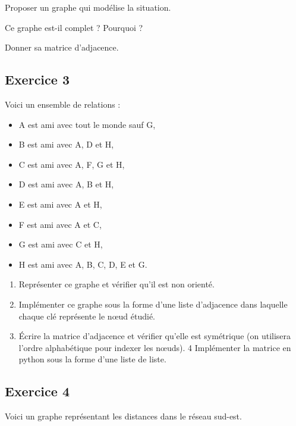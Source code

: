 \documentclass[
  letterpaper,
  DIV=11,
  numbers=noendperiod]{scrartcl}
\providecommand{\tightlist}{%
  \setlength{\itemsep}{0pt}\setlength{\parskip}{0pt}}\usepackage{longtable,booktabs,array}
\begin{document}
Proposer un graphe qui modélise la situation.

Ce graphe est-il complet ? Pourquoi ?

Donner sa matrice d'adjacence.

\hypertarget{fa-solid-pencil-alt-exercice-3}{%
\subsection{\texorpdfstring{ Exercice
3}{ Exercice 3}}\label{fa-solid-pencil-alt-exercice-3}}

Voici un ensemble de relations :

\begin{itemize}
\tightlist
\item
  A est ami avec tout le monde sauf G,
\item
  B est ami avec A, D et H,
\item
  C est ami avec A, F, G et H,
\item
  D est ami avec A, B et H,
\item
  E est ami avec A et H,
\item
  F est ami avec A et C,
\item
  G est ami avec C et H,
\item
  H est ami avec A, B, C, D, E et G.
\end{itemize}

\begin{enumerate}
\def\labelenumi{\arabic{enumi}.}
\tightlist
\item
  Représenter ce graphe et vérifier qu'il est non orienté.
\item
  Implémenter ce graphe sous la forme d'une liste d'adjacence dans
  laquelle chaque clé représente le nœud étudié.
\item
  Écrire la matrice d'adjacence et vérifier qu'elle est symétrique (on
  utilisera l'ordre alphabétique pour indexer les nœuds). 4 Implémenter
  la matrice en python sous la forme d'une liste de liste.
\end{enumerate}

\hypertarget{fa-solid-pencil-alt-exercice-4}{%
\subsection{\texorpdfstring{ Exercice
4}{ Exercice 4}}\label{fa-solid-pencil-alt-exercice-4}}

Voici un graphe représentant les distances dans le réseau sud-est.
\end{document}
